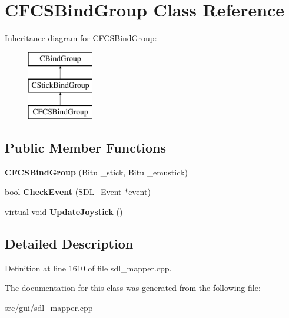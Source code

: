 \hypertarget{classCFCSBindGroup}{\section{C\-F\-C\-S\-Bind\-Group Class Reference}
\label{classCFCSBindGroup}
}
Inheritance diagram for C\-F\-C\-S\-Bind\-Group\-:\begin{figure}[H]
\begin{center}
\leavevmode
\includegraphics[height=3.000000cm]{classCFCSBindGroup}
\end{center}
\end{figure}
\subsection*{Public Member Functions}
\begin{DoxyCompactItemize}
\item 
\hypertarget{classCFCSBindGroup_a366a39efa7db658cfdec657580818264}{{\bfseries C\-F\-C\-S\-Bind\-Group} (Bitu \-\_\-stick, Bitu \-\_\-emustick)}\label{classCFCSBindGroup_a366a39efa7db658cfdec657580818264}

\item 
\hypertarget{classCFCSBindGroup_a25a662090cb26b626cac51449c94e3af}{bool {\bfseries Check\-Event} (S\-D\-L\-\_\-\-Event $\ast$event)}\label{classCFCSBindGroup_a25a662090cb26b626cac51449c94e3af}

\item 
\hypertarget{classCFCSBindGroup_a19be69d6c38cc544b2b4517eeab84fef}{virtual void {\bfseries Update\-Joystick} ()}\label{classCFCSBindGroup_a19be69d6c38cc544b2b4517eeab84fef}

\end{DoxyCompactItemize}


\subsection{Detailed Description}


Definition at line 1610 of file sdl\-\_\-mapper.\-cpp.



The documentation for this class was generated from the following file\-:\begin{DoxyCompactItemize}
\item 
src/gui/sdl\-\_\-mapper.\-cpp\end{DoxyCompactItemize}
